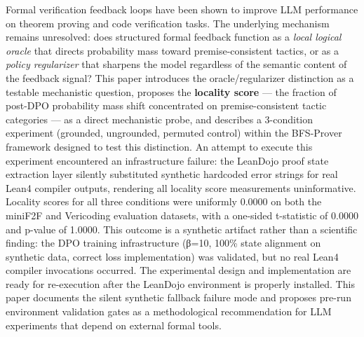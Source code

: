 
Formal verification feedback loops have been shown to improve LLM performance on theorem proving and code verification tasks. The underlying mechanism remains unresolved: does structured formal feedback function as a \textit{local logical oracle} that directs probability mass toward premise-consistent tactics, or as a \textit{policy regularizer} that sharpens the model regardless of the semantic content of the feedback signal? This paper introduces the oracle/regularizer distinction as a testable mechanistic question, proposes the \textbf{locality score} — the fraction of post-DPO probability mass shift concentrated on premise-consistent tactic categories — as a direct mechanistic probe, and describes a 3-condition experiment (grounded, ungrounded, permuted control) within the BFS-Prover framework designed to test this distinction. An attempt to execute this experiment encountered an infrastructure failure: the LeanDojo proof state extraction layer silently substituted synthetic hardcoded error strings for real Lean4 compiler outputs, rendering all locality score measurements uninformative. Locality scores for all three conditions were uniformly 0.0000 on both the miniF2F and Vericoding evaluation datasets, with a one-sided t-statistic of 0.0000 and p-value of 1.0000. This outcome is a synthetic artifact rather than a scientific finding: the DPO training infrastructure (β=10, 100\% state alignment on synthetic data, correct loss implementation) was validated, but no real Lean4 compiler invocations occurred. The experimental design and implementation are ready for re-execution after the LeanDojo environment is properly installed. This paper documents the silent synthetic fallback failure mode and proposes pre-run environment validation gates as a methodological recommendation for LLM experiments that depend on external formal tools.
